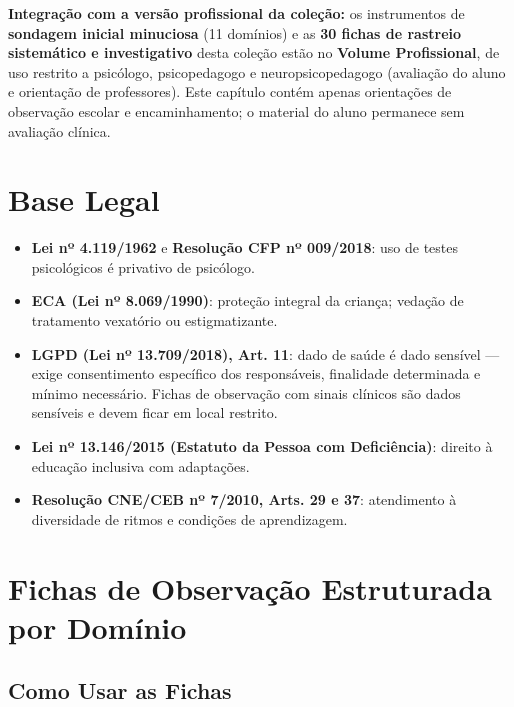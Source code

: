 \begin{avaliacao}
\textbf{Integração com a versão profissional da coleção:} os instrumentos de
\textbf{sondagem inicial minuciosa} (11 domínios) e as \textbf{30 fichas de
rastreio sistemático e investigativo} desta coleção estão no
\textbf{Volume Profissional}, de uso restrito a psicólogo, psicopedagogo e
neuropsicopedagogo (avaliação do aluno e orientação de professores). Este
capítulo contém apenas orientações de observação escolar e encaminhamento;
o material do aluno permanece sem avaliação clínica.
\end{avaliacao}

\section{Base Legal}

\begin{itemize}
  \item \textbf{Lei nº 4.119/1962} e \textbf{Resolução CFP nº 009/2018}: uso
        de testes psicológicos é privativo de psicólogo.
  \item \textbf{ECA (Lei nº 8.069/1990)}: proteção integral da criança;
        vedação de tratamento vexatório ou estigmatizante.
  \item \textbf{LGPD (Lei nº 13.709/2018), Art. 11}: dado de saúde é dado
        sensível — exige consentimento específico dos responsáveis, finalidade
        determinada e mínimo necessário. Fichas de observação com sinais
        clínicos são dados sensíveis e devem ficar em local restrito.
  \item \textbf{Lei nº 13.146/2015 (Estatuto da Pessoa com Deficiência)}:
        direito à educação inclusiva com adaptações.
  \item \textbf{Resolução CNE/CEB nº 7/2010, Arts. 29 e 37}: atendimento à
        diversidade de ritmos e condições de aprendizagem.
\end{itemize}

\section{Fichas de Observação Estruturada por Domínio}

\subsection{Como Usar as Fichas}


